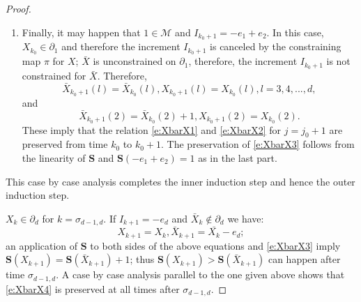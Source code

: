 \documentclass[11pt,a4paper]{article}
\begin{document}
\begin{proof}
\begin{enumerate}
\begin{enumerate}
are trivially preserved
from time $k=k_0$ to $k= k_0 + 1.$  If $\bar{X}_{k_0}(m) > X_{k_0}(m)$ then the increment $-e_m  + e_{m+1}$ is unconstrained
for $\bar{X}$ while it is constrained for $X$:
\[
X_{k_0+1} = X_{k_0},  \bar{X}_{k_0+1} = \bar{X}_{k_0} - e_m + e_{m+1}.
\]
The linearity of ${\bm S}$ and ${\bm S}(-e_m + e_{m+1}) = 0$ imply
that \eqref{e:XbarX3} is preserved at time $k_0 + 1.$ 
All of the components $\bar{X}(l)$, $l \neq m, m+1$ remain unchanged from $k_0$ to $k_0 + 1$.
Therefore, 
the relations \eqref{e:XbarX1} and \eqref{e:XbarX2} are trivially preserved for these components; in particular, this shows that
\eqref{e:XbarX2} holds at time $k_0 + 1$ with $j=j_0 + 1$
because $m, m+1 \le (j_0 + 1) + 2.$
To complete the proof it suffices to show that \eqref{e:XbarX1}
holds for $j=j_0 + 1$ and $k= k_0 +1$ for components $l=m$ and $l=m+1$.
For $l = m+1$, 
\[
\bar{X}_{k_0+1}(m+1) = 
\bar{X}_{k_0}(m+1) + 1 \ge X_{k_0}(m+1) = X_{k_0 + 1}(m+1).
\]
For $l= m$: recall that we are treating the case
 $\bar{X}_{k_0}(m) > X_{k_0}(m)$, i.e., 
 $\bar{X}_{k_0}(m) \ge X_{k_0}(m) + 1$. Therefore:
\[
\bar{X}_{k_0+1}(m+1) = \bar{X}_{k_0}(m+1) - 1 \ge X_{k_0}(m+1) = X_{k_0 + 1}(m+1);
\]
these prove that \eqref{e:XbarX1} holds at time $k_0 + 1$ with $j=j_0 + 1.$
\item Finally, it may happen that $1 \in {\mathcal M}$ and
$I_{k_0 + 1} = -e_1 + e_2$. In this case, $X_{k_0} \in \partial_1$
and therefore the increment $I_{k_0 + 1}$ is canceled by the constraining
map $\pi$ for $X$; $\bar{X}$ is unconstrained on $\partial_1$, therefore,
the increment $I_{k_0+1}$ is not constrained for $\bar{X}$. Therefore,
\[
\bar{X}_{k_0 + 1}(l) = \bar{X}_{k_0}(l), 
{X}_{k_0 + 1}(l) = X_{k_0}(l), l =3,4,...,d,
\]
and
\[
\bar{X}_{k_0 + 1}(2) = \bar{X}_{k_0}(2) + 1,
{X}_{k_0 + 1}(2) = X_{k_0}(2).
\]
These imply that the relation \eqref{e:XbarX1} and \eqref{e:XbarX2} for
$j = j_0 +1$
are preserved from time $k_0$ to $k_0 + 1.$
The preservation of \eqref{e:XbarX3} follows from the linearity of
${\bm S}$ and ${\bm S}(-e_1 + e_2) =1$ as in the last part.
\end{enumerate}
\end{enumerate}
This case by case analysis completes the inner induction step and hence
the outer induction step.

$X_k \in \partial_d$ for $k=\sigma_{d-1,d}$. 
If
$I_{k+1} = -e_d$ and $\bar{X}_k \notin \partial_d$ we have:
\[
X_{k+1} = X_k, \bar{X}_{k+1} = \bar{X_k} - e_d;
\]
an application of ${\bm S}$ to both sides of the above equations
and \eqref{e:XbarX3} imply ${\bm S}(X_{k+1}) = {\bm S}(\bar{X}_{k+1}) +1$;
thus 
${\bm S}(X_{k+1}) > {\bm S}(\bar{X}_{k+1})$ can happen
after time $\sigma_{d-1,d}$.
A case by case analysis parallel to the one given above shows that 
\eqref{e:XbarX4} is preserved at all times after $\sigma_{d-1,d}.$
\end{proof}
\end{document}
